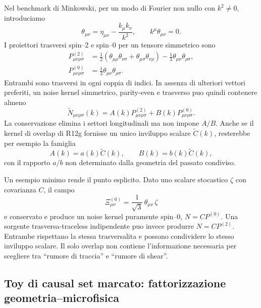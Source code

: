 \documentclass[11pt,a4paper]{article}
\begin{document}
Nel benchmark di Minkowski, per un modo di Fourier non nullo con $k^2\neq0$, introduciamo
\begin{equation}
 \theta_{\mu\nu}=\eta_{\mu\nu}-\frac{k_\mu k_\nu}{k^2},
 \qquad
 k^\mu\theta_{\mu\nu}=0.
\end{equation}
I proiettori trasversi spin--2 e spin--0 per un tensore simmetrico sono \cite{Barnes1965}
\begin{align}
 P^{(2)}_{\mu\nu\rho\sigma}
 &=\frac12\left(\theta_{\mu\rho}\theta_{\nu\sigma}
 +\theta_{\mu\sigma}\theta_{\nu\rho}\right)
 -\frac13\theta_{\mu\nu}\theta_{\rho\sigma},\\
 P^{(0)}_{\mu\nu\rho\sigma}
 &=\frac13\theta_{\mu\nu}\theta_{\rho\sigma}.
 \label{eq:r12i_projectors}
\end{align}
Entrambi sono trasversi in ogni coppia di indici. In assenza di ulteriori vettori preferiti, un noise kernel simmetrico, parity-even e trasverso puo quindi contenere almeno
\begin{equation}
 \boxed{
 \widetilde N_{\mu\nu\rho\sigma}(k)
 =A(k)P^{(2)}_{\mu\nu\rho\sigma}
 +B(k)P^{(0)}_{\mu\nu\rho\sigma}.
 }
 \label{eq:r12i_spectral_general}
\end{equation}
La conservazione elimina i settori longitudinali ma non impone $A/B$. Anche se il kernel di overlap di R12g fornisse un unico inviluppo scalare $\widetilde C(k)$, resterebbe per esempio la famiglia
\begin{equation}
 A(k)=a(k)\widetilde C(k),
 \qquad
 B(k)=b(k)\widetilde C(k),
\end{equation}
con il rapporto $a/b$ non determinato dalla geometria del passato condiviso.

Un esempio minimo rende il punto esplicito. Dato uno scalare stocastico $\zeta$ con covarianza $C$, il campo
\begin{equation}
 \Xi^{(0)}_{\mu\nu}
 =\frac{1}{\sqrt3}\,\theta_{\mu\nu}\,\zeta
 \label{eq:r12i_spin0_source}
\end{equation}
e conservato e produce un noise kernel puramente spin--0, $N=C P^{(0)}$. Una sorgente trasversa-traceless indipendente puo invece produrre $N=C P^{(2)}$. Entrambe rispettano la stessa trasversalita e possono condividere lo stesso inviluppo scalare. Il solo overlap non contiene l'informazione necessaria per scegliere tra ``rumore di traccia'' e ``rumore di shear''.

\subsection{Toy di causal set marcato: fattorizzazione geometria--microfisica}
\end{document}

